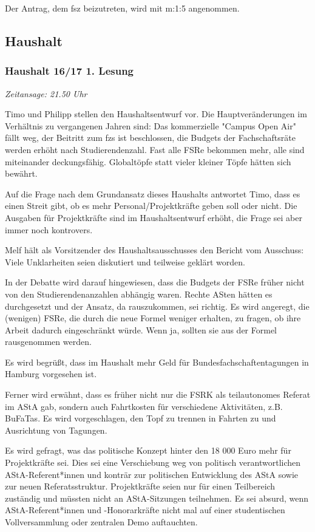 \documentclass[ngerman,headheight=70pt]{scrartcl}
\begin{document}
    Der Antrag, dem fsz beizutreten, wird mit m:1:5 angenommen.

    \subsection{Haushalt}

    \subsubsection{Haushalt 16/17 1. Lesung}

    \textit{Zeitansage: 21.50 Uhr}

    Timo und Philipp stellen den Haushaltsentwurf vor. Die Hauptveränderungen im
    Verhältnis zu vergangenen Jahren sind: Das kommerzielle "Campus Open Air"
    fällt weg, der Beitritt zum fzs ist beschlossen, die Budgets der
    Fachschaftsräte werden erhöht nach Studierendenzahl. Fast alle FSRe bekommen
    mehr, alle sind miteinander deckungsfähig. Globaltöpfe statt vieler kleiner
    Töpfe hätten sich bewährt.

    Auf die Frage nach dem Grundansatz dieses Haushalts antwortet Timo, dass es
    einen Streit gibt, ob es mehr Personal/Projektkräfte geben soll oder nicht.
    Die Ausgaben für Projektkräfte sind im Haushaltsentwurf erhöht, die Frage
    sei aber immer noch kontrovers.

    Melf hält als Vorsitzender des Haushaltsausschusses den Bericht vom
    Ausschuss: Viele Unklarheiten seien diskutiert und teilweise geklärt worden.

    In der Debatte wird darauf hingewiesen, dass die Budgets der FSRe früher
    nicht von den Studierendenanzahlen abhängig waren. Rechte ASten hätten es
    durchgesetzt und der Ansatz, da rauszukommen, sei richtig. Es wird angeregt,
    die (wenigen) FSRe, die durch die neue Formel weniger erhalten, zu fragen,
    ob ihre Arbeit dadurch eingeschränkt würde. Wenn ja, sollten sie aus der
    Formel rausgenommen werden.

    Es wird begrüßt, dass im Haushalt mehr Geld für Bundesfachschaftentagungen
    in Hamburg vorgesehen ist.

    Ferner wird erwähnt, dass es früher nicht nur die FSRK als teilautonomes
    Referat im AStA gab, sondern auch Fahrtkosten für verschiedene Aktivitäten,
    z.B. BuFaTas. Es wird vorgeschlagen, den Topf zu trennen in Fahrten zu und
    Ausrichtung von Tagungen.

    Es wird gefragt, was das politische Konzept hinter den 18 000 Euro mehr für
    Projektkräfte sei. Dies sei eine Verschiebung weg von politisch
    verantwortlichen AStA-Referent*innen und konträr zur politischen Entwicklung
    des AStA sowie zur neuen Referatsstruktur. Projektkräfte seien nur für einen
    Teilbereich zuständig und müssten nicht an AStA-Sitzungen teilnehmen. Es sei
    absurd, wenn AStA-Referent*innen und -Honorarkräfte nicht mal auf einer
    studentischen Vollversammlung oder zentralen Demo auftauchten.
\end{document}
